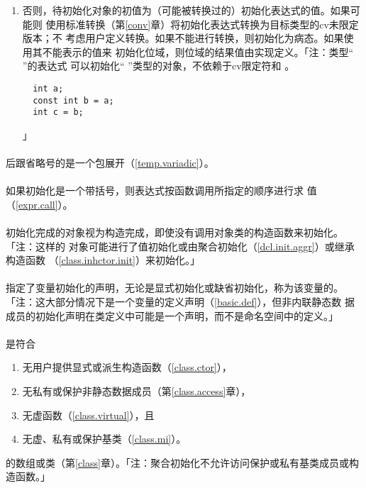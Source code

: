\begin{enumerate}
{    用所选的用户定义转换以转换初始化表达式为待初始化对象。如果不能进行转换或有歧
    义，则初始化为病态。}
  \item{否则，待初始化对象的初值为（可能被转换过的）初始化表达式的值。如果可能则
    使用标准转换（第\ref{conv}章）将初始化表达式转换为目标类型的cv未限定版本；不
    考虑用户定义转换。如果不能进行转换，则初始化为病态。如果使用其不能表示的值来
    初始化位域，则位域的结果值由实现定义。「注：类型`` ''的表达式
    可以初始化`` ''类型的对象，不依赖于cv限定符和
    。
\begin{lstlisting}
  int a;
  const int b = a;
  int c = b;
\end{lstlisting}」}
\end{enumerate}

\paragraph{}
后跟省略号的是一个包展开（\ref{temp.variadic}）。

\paragraph{}
如果初始化是一个带括号，则表达式按函数调用所指定的顺序进行求
值（\ref{expr.call}）。

\paragraph{}
初始化完成的对象视为构造完成，即使没有调用对象类的构造函数来初始化。「注：这样的
对象可能进行了值初始化或由聚合初始化（\ref{dcl.init.aggr}）或继承构造函数
（\ref{class.inhctor.init}）来初始化。」

\paragraph{}
指定了变量初始化的声明，无论是显式初始化或缺省初始化，称为该变量的。「注：这大部分情况下是一个变量的定义声明（\ref{basic.def}），但非内联静态数
据成员的初始化声明在类定义中可能是一个声明，而不是命名空间中的定义。」

\paragraph{}
是符合
\begin{enumerate}
  \item{无用户提供显式或派生构造函数（\ref{class.ctor}），}
  \item{无私有或保护非静态数据成员（第\ref{class.access}章），}
  \item{无虚函数（\ref{class.virtual}），且}
  \item{无虚、私有或保护基类（\ref{class.mi}）。}
\end{enumerate}
的数组或类（第\ref{class}章）。「注：聚合初始化不允许访问保护或私有基类成员或构
造函数。」

